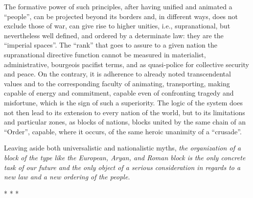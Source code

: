 The formative power of such principles, after having unified and animated a ``people'', can be projected beyond its borders and, in different ways, does not exclude those of war, can give rise to higher unities, i.e., supranational, but nevertheless well defined, and ordered by a determinate law: they are the ``imperial spaces''. The ``rank'' that goes to assure to a given nation the supranational directive function cannot be measured in materialist, administrative, bourgeois pacifist terms, and as quasi-police for collective security and peace. On the contrary, it is adherence to already noted transcendental values and to the corresponding faculty of animating, transporting, making capable of energy and commitment, capable even of confronting tragedy and misfortune, which is the sign of such a superiority. The logic of the system does not then lead to its extension to every nation of the world, but to its limitations and particular zones, as blocks of nations, blocks united by the same chain of an ``Order'', capable, where it occurs, of the same heroic unanimity of a ``crusade''.

Leaving aside both universalistic and nationalistic myths, \emph{the organization of a block of the type like the European, Aryan, and Roman block is the only concrete task of our future and the only object of a serious consideration in regards to a new law and a new ordering of the people.}




\begin{center}* * *\end{center}

